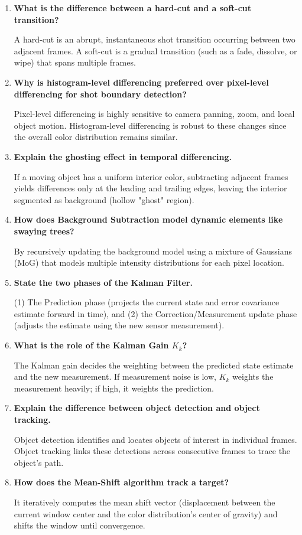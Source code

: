 \documentclass[12pt,a4paper]{article}
\newcommand{\Q}[1]{\textbf{#1}\par\noindent\ignorespaces}
\begin{document}
\begin{tcolorbox}[exambox, title={\textbf{Frequently Asked / Viva Questions}}]
\begin{enumerate}[leftmargin=*, itemsep=3.5pt, label=\arabic*.]
  \item \Q{What is the difference between a hard-cut and a soft-cut transition?} A hard-cut is an abrupt, instantaneous shot transition occurring between two adjacent frames. A soft-cut is a gradual transition (such as a fade, dissolve, or wipe) that spans multiple frames.
  \item \Q{Why is histogram-level differencing preferred over pixel-level differencing for shot boundary detection?} Pixel-level differencing is highly sensitive to camera panning, zoom, and local object motion. Histogram-level differencing is robust to these changes since the overall color distribution remains similar.
  \item \Q{Explain the ghosting effect in temporal differencing.} If a moving object has a uniform interior color, subtracting adjacent frames yields differences only at the leading and trailing edges, leaving the interior segmented as background (hollow "ghost" region).
  \item \Q{How does Background Subtraction model dynamic elements like swaying trees?} By recursively updating the background model using a mixture of Gaussians (MoG) that models multiple intensity distributions for each pixel location.
  \item \Q{State the two phases of the Kalman Filter.} (1) The Prediction phase (projects the current state and error covariance estimate forward in time), and (2) the Correction/Measurement update phase (adjusts the estimate using the new sensor measurement).
  \item \Q{What is the role of the Kalman Gain $K_k$?} The Kalman gain decides the weighting between the predicted state estimate and the new measurement. If measurement noise is low, $K_k$ weights the measurement heavily; if high, it weights the prediction.
  \item \Q{Explain the difference between object detection and object tracking.} Object detection identifies and locates objects of interest in individual frames. Object tracking links these detections across consecutive frames to trace the object's path.
  \item \Q{How does the Mean-Shift algorithm track a target?} It iteratively computes the mean shift vector (displacement between the current window center and the color distribution's center of gravity) and shifts the window until convergence.

\end{enumerate}
\end{tcolorbox}
\end{document}
